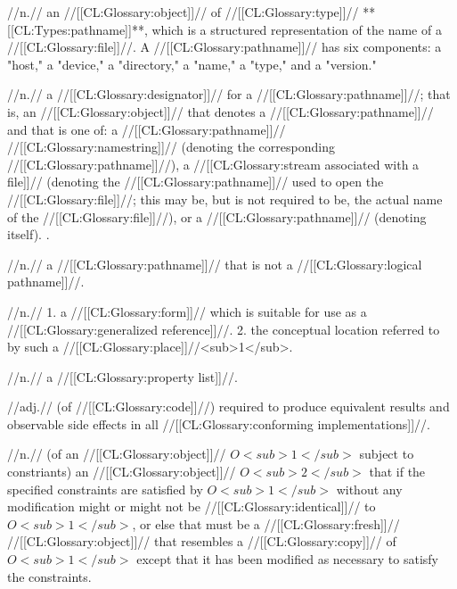  //n.// an //[[CL:Glossary:object]]// of //[[CL:Glossary:type]]// **[[CL:Types:pathname]]**, which is a structured representation of the name of a //[[CL:Glossary:file]]//. A //[[CL:Glossary:pathname]]// has six components: a "host," a "device," a "directory," a "name," a "type," and a "version."

 //n.// a //[[CL:Glossary:designator]]// for a //[[CL:Glossary:pathname]]//; that is, an //[[CL:Glossary:object]]// that denotes a //[[CL:Glossary:pathname]]// and that is one of:
 a //[[CL:Glossary:pathname]]// //[[CL:Glossary:namestring]]// 
 (denoting the corresponding //[[CL:Glossary:pathname]]//), a //[[CL:Glossary:stream associated with a file]]// (denoting the //[[CL:Glossary:pathname]]// used to open the //[[CL:Glossary:file]]//; this may be, but is not required to be, the actual name of the //[[CL:Glossary:file]]//), or a //[[CL:Glossary:pathname]]// (denoting itself). \Seesection\OpenAndClosedStreams.


 //n.// a //[[CL:Glossary:pathname]]// that is not a //[[CL:Glossary:logical pathname]]//.


 //n.// 1. a //[[CL:Glossary:form]]// which is suitable for use as a //[[CL:Glossary:generalized reference]]//. 2. the conceptual location referred to by such a //[[CL:Glossary:place]]//<sub>1</sub>.

 //n.// a //[[CL:Glossary:property list]]//.

 //adj.// (of //[[CL:Glossary:code]]//) required to produce equivalent results and observable side effects in all //[[CL:Glossary:conforming implementations]]//.

 //n.// (of an //[[CL:Glossary:object]]// $O<sub>1</sub>$ subject to constriants) an //[[CL:Glossary:object]]// $O<sub>2</sub>$ that if the specified constraints are satisfied by $O<sub>1</sub>$ without any modification might or might not be //[[CL:Glossary:identical]]// to $O<sub>1</sub>$, or else that must be a //[[CL:Glossary:fresh]]// //[[CL:Glossary:object]]// that resembles a //[[CL:Glossary:copy]]// of $O<sub>1</sub>$ except that it has been modified as necessary to satisfy the constraints.

